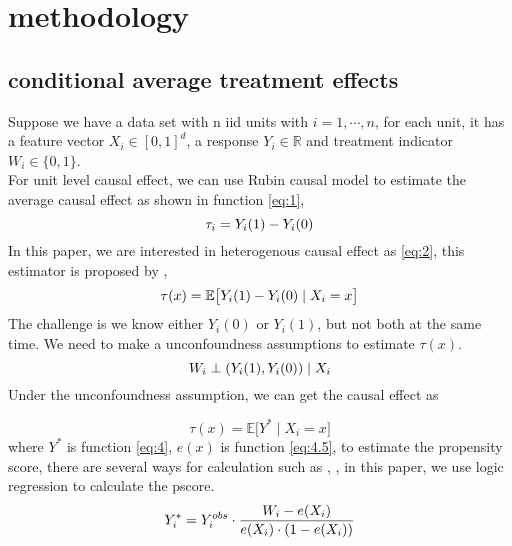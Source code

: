 \section{methodology}

\subsection{conditional average treatment effects}

Suppose we have a data set with n iid units with $ i = 1, \cdots, n$, for each unit, it has a feature vector $X_{i}  \in [0,1]^d$, a response $Y_{i} \in \mathbb{R}$ and treatment indicator $W_{i} \in \{0,1\}$.\\
For unit level causal effect, we can use Rubin causal model to estimate the average causal effect as shown in function \ref{eq:1},
\begin{equation} \label{eq:1}
\tau_{i} = Y_{i}(1) - Y_{i}(0) \\
\end{equation}
In this paper, we are interested in heterogenous causal effect as \ref{eq:2}, this estimator is proposed by \cite{RePEc:ecm:emetrp:v:71:y:2003:i:4:p:1161-1189},
\begin{equation} \label{eq:2}
\tau(x) = \mathbb{E} \big[{Y_{i}(1) - Y_{i}(0) \mid X_{i} = x}\big]\\
\end{equation}
The challenge is we know either $Y_{i}(0)$ or $Y_{i}(1)$, but not both at the same time. 
We need to make a unconfoundness assumptions to estimate $\tau(x)$.
\begin{equation} \label{eq:3}
W_{i} \perp \left( Y_{i}(1), Y_{i}(0) \right)  \mid X_{i}\\
\end{equation}
Under the unconfoundness assumption, we can get the causal effect as 

\begin{equation}\label{eq:3.5}
\tau(x) = \mathbb{E} \big[   Y^{*} \mid X_{i} =  x\big] 
\end{equation}
where $Y^{*}$  is function \ref{eq:4}, $e(x)$ is function \ref{eq:4.5}, to estimate the propensity score, there are several ways for calculation such as \cite{rose:rubi:cent:1983}, \cite{HoImaKin07}, in this paper, we use logic regression to calculate the pscore.
\begin{equation} \label{eq:4}
Y_{i}^{*} =  Y_{i}^{obs} \cdot \frac{W_{i} - e(X_{i})}{e(X_{i}) \cdot (1 - e(X_{i}))} \\
\end{equation}

